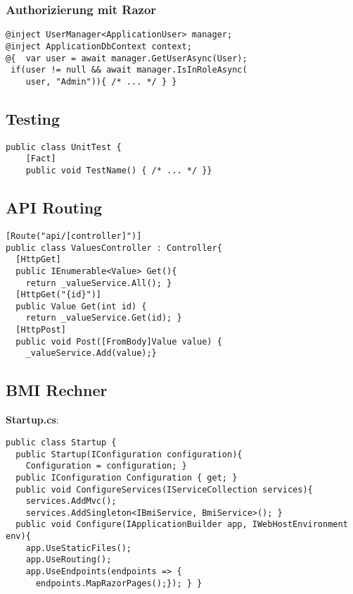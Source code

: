 \subsubsection{Authorizierung mit Razor}
\begin{lstlisting}[style=CSharp]
@inject UserManager<ApplicationUser> manager;
@inject ApplicationDbContext context;
@{  var user = await manager.GetUserAsync(User);
 if(user != null && await manager.IsInRoleAsync(
    user, "Admin")){ /* ... */ } }
\end{lstlisting}

\subsection{Testing}
\begin{lstlisting}[style=CSharp]
public class UnitTest {
    [Fact]
    public void TestName() { /* ... */ }}
\end{lstlisting}
%
%

\subsection{API Routing}
\begin{lstlisting}[style=CSharp]
[Route("api/[controller]")]
public class ValuesController : Controller{
  [HttpGet]
  public IEnumerable<Value> Get(){
    return _valueService.All(); }
  [HttpGet("{id}")]
  public Value Get(int id) {
    return _valueService.Get(id); }
  [HttpPost]
  public void Post([FromBody]Value value) {
    _valueService.Add(value);}
\end{lstlisting}






\subsection{BMI Rechner}
\textbf{Startup.cs}:
\begin{lstlisting}[style=CSharp]
public class Startup {
  public Startup(IConfiguration configuration){
    Configuration = configuration; }
  public IConfiguration Configuration { get; }
  public void ConfigureServices(IServiceCollection services){
    services.AddMvc();
    services.AddSingleton<IBmiService, BmiService>(); }
  public void Configure(IApplicationBuilder app, IWebHostEnvironment env){
    app.UseStaticFiles();
    app.UseRouting();
    app.UseEndpoints(endpoints => {
      endpoints.MapRazorPages();}); } }
\end{lstlisting}

